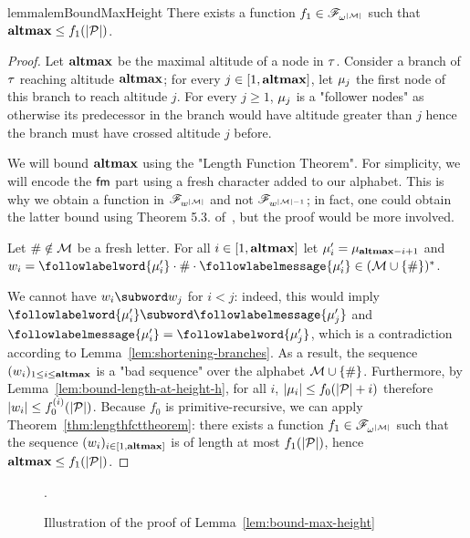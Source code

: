 \begin{restatable}{lemma}{lemBoundMaxHeight}
	\label{lem:bound-max-height}
	There exists a function $f_1 \in \mathscr{F}_{\omega^{|\mathcal{M}|}}$ such that $\mathbf{altmax} \leq f_1(|\mathcal{P}|)$.
\end{restatable}
\begin{proof}
	Let $\mathbf{altmax}$ be the maximal altitude of a node in $\tau$. Consider a branch of $\tau$ reaching altitude $\mathbf{altmax}$; for every $j \in [1,\mathbf{altmax}]$, let $\mu_j$ the first node of this branch to reach altitude $j$. For every $j \geq 1$, $\mu_j$ is a "follower nodes" as otherwise its predecessor in the branch would have altitude greater than $j$ hence the branch must have crossed altitude $j$ before.
	
	We will bound $\mathbf{altmax}$ using the "Length Function Theorem". For simplicity, we will encode the $\mathsf{fm}$ part using a fresh character added to our alphabet. This is why we obtain a function in $\mathscr{F}_{w^{|\mathcal{M}|}}$ and not $\mathscr{F}_{w^{|\mathcal{M}|-1}}$; in fact, one could obtain the latter bound using Theorem 5.3. of~\cite{SchmitzS2011upperHigman}, but the proof would be more involved.

	Let $\# \notin \mathcal{M}$ be a fresh letter. For all $i \in [1,\mathbf{altmax}]$ let $\mu'_i = \mu_{\mathbf{altmax} - i+1}$ and $w_i = \followlabelword{\node'_{i}} \cdot \# \cdot \followlabelmessage{\node'_{i}} \in (\messages \cup \set{\#})^*$.
	
	We cannot have $w_{i}\subword w_{j}$ for $i< j$: indeed, this would imply $\followlabelword{\node'_{i}} \subword \followlabelmessage{\node'_{j}}$ and $\followlabelmessage{\node'_{i}} = \followlabelword{\node'_{j}}$, which is a contradiction according to Lemma~\ref{lem:shortening-branches}.
	As a result, the sequence $(w_i)_{1\leq i \leq \mathbf{altmax}}$ is a "bad sequence" over the alphabet $\mathcal{M}\cup\{\#\}$.
	Furthermore, by Lemma~\ref{lem:bound-length-at-height-h}, for all $i$, $|\mu_{i}| \leq f_0(|\mathcal{P}| + i)$ therefore $|w_i| \leq f_0^{(i)}(|\mathcal{P}|)$.
	Because $f_0$ is primitive-recursive, we can apply Theorem~\ref{thm:lengthfcttheorem}: there exists a function $f_1 \in \mathscr{F}_{\omega^{|\mathcal{M}|}}$ such that the sequence $(w_i)_{i \in [1,\mathbf{altmax}]}$ is of length at most $f_1(|\mathcal{P}|)$, hence $\mathbf{altmax} \leq f_1(|\mathcal{P}|)$. 
\end{proof}
\begin{figure}[h]
	
	\caption{Illustration of the proof of Lemma~\ref{lem:bound-max-height}}.
	\label{fig:max-height-bound}
\end{figure}

